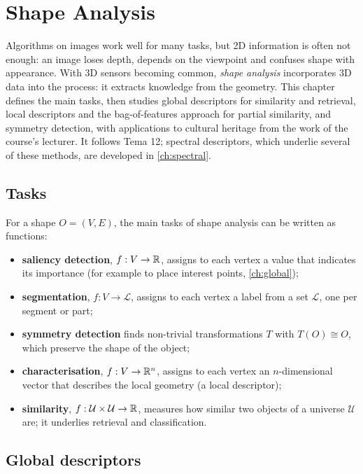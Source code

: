 \chapter{Shape Analysis}\label{ch:shape}

Algorithms on images work well for many tasks, but 2D information is often not enough: an image
loses depth, depends on the viewpoint and confuses shape with appearance. With 3D sensors becoming
common, \emph{shape analysis} incorporates 3D data into the process: it extracts knowledge from the
geometry. This chapter defines the main tasks, then studies global descriptors for similarity and
retrieval, local descriptors and the bag-of-features approach for partial similarity, and symmetry
detection, with applications to cultural heritage from the work of the course's lecturer. It
follows Tema 12; spectral descriptors, which underlie several of these methods, are developed in
\cref{ch:spectral}.

\section{Tasks}

For a shape $O=(V,E)$, the main tasks of shape analysis can be written as functions:
\begin{itemize}
  \item \textbf{saliency detection}, $f:V\to\mathbb{R}$, assigns to each vertex a value that indicates its
  importance (for example to place interest points, \cref{ch:global});
  \item \textbf{segmentation}, $f:V\to\mathcal L$, assigns to each vertex a label from a set
  $\mathcal L$, one per segment or part;
  \item \textbf{symmetry detection} finds non-trivial transformations $T$ with $T(O)\cong O$, which
  preserve the shape of the object;
  \item \textbf{characterisation}, $f:V\to\mathbb{R}^n$, assigns to each vertex an $n$-dimensional vector that
  describes the local geometry (a local descriptor);
  \item \textbf{similarity}, $f:\mathcal U\times\mathcal U\to\mathbb{R}$, measures how similar two objects of a
  universe $\mathcal U$ are; it underlies retrieval and classification.
\end{itemize}

\section{Global descriptors}

